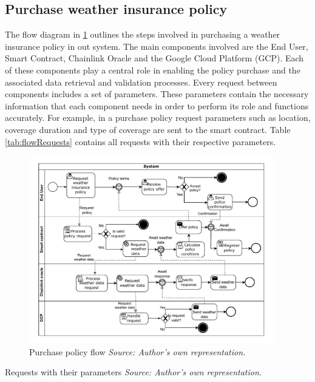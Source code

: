 \subsection{Purchase weather insurance policy}\label{subsection:purchasePolicyFlow}

The flow diagram in \cref{fig:purchasePolicyFlow} outlines the steps involved in purchasing a weather insurance policy in out system. The main components involved are the End User, Smart Contract, Chainlink Oracle and the Google Cloud Platform (GCP). Each of these components play a central role in enabling the policy purchase and the associated data retrieval and validation processes. Every request between components includes a set of parameters. These parameters contain the necessary information that each component needs in order to perform its role and functions accurately. For example, in a purchase policy request parameters such as location, coverage duration and type of coverage are sent to the smart contract. Table \cref{tab:flowRequests} contains all requests with their respective parameters.

\begin{figure}[h]
    \centering
    \includegraphics[width=0.95\textwidth]{figures/flow-purchase-policy.drawio.pdf}
    \caption{Purchase policy flow \textit{Source: Author's own representation.}}
    \label{fig:purchasePolicyFlow}
\end{figure}

\begin{table}[h]
    \centering
    
    \caption{Requests with their parameters \textit{Source: Author's own representation.}}
    \label{tab:flowRequests}
\end{table}


